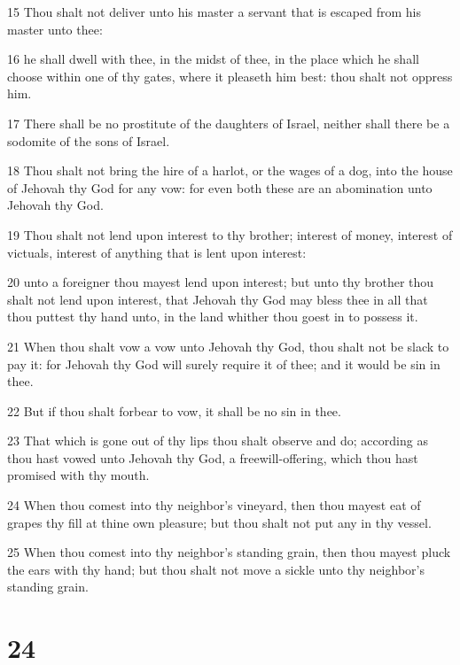 \par 15 Thou shalt not deliver unto his master a servant that is escaped from his master unto thee:
\par 16 he shall dwell with thee, in the midst of thee, in the place which he shall choose within one of thy gates, where it pleaseth him best: thou shalt not oppress him.
\par 17 There shall be no prostitute of the daughters of Israel, neither shall there be a sodomite of the sons of Israel.
\par 18 Thou shalt not bring the hire of a harlot, or the wages of a dog, into the house of Jehovah thy God for any vow: for even both these are an abomination unto Jehovah thy God.
\par 19 Thou shalt not lend upon interest to thy brother; interest of money, interest of victuals, interest of anything that is lent upon interest:
\par 20 unto a foreigner thou mayest lend upon interest; but unto thy brother thou shalt not lend upon interest, that Jehovah thy God may bless thee in all that thou puttest thy hand unto, in the land whither thou goest in to possess it.
\par 21 When thou shalt vow a vow unto Jehovah thy God, thou shalt not be slack to pay it: for Jehovah thy God will surely require it of thee; and it would be sin in thee.
\par 22 But if thou shalt forbear to vow, it shall be no sin in thee.
\par 23 That which is gone out of thy lips thou shalt observe and do; according as thou hast vowed unto Jehovah thy God, a freewill-offering, which thou hast promised with thy mouth.
\par 24 When thou comest into thy neighbor's vineyard, then thou mayest eat of grapes thy fill at thine own pleasure; but thou shalt not put any in thy vessel.
\par 25 When thou comest into thy neighbor's standing grain, then thou mayest pluck the ears with thy hand; but thou shalt not move a sickle unto thy neighbor's standing grain.

\chapter{24}

